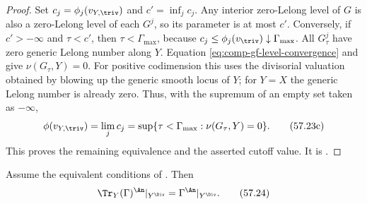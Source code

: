 \begin{proof}
Set $c_j=\phi_j(v_{Y,\triv})$ and $c'=\inf_jc_j$.
Any interior zero-Lelong level of $G$ is also a zero-Lelong level
of each $G^j$, so its parameter is at most $c'$.
Conversely, if $c'>-\infty$ and $\tau<c'$, then
$\tau<\Gamma_{\max}$, because
$c_j\leq\phi_j(v_{\triv})\downarrow\Gamma_{\max}$.
All $G^j_\tau$ have zero generic Lelong number along $Y$.
Equation \eqref{eq:comp-gf-level-convergence} and
\cite[Theorem~6.2.4]{XiaBook} give $\nu(G_\tau,Y)=0$.
For positive codimension this uses the divisorial valuation obtained
by blowing up the generic smooth locus of $Y$; for $Y=X$ the
generic Lelong number is already zero.
Thus, with the supremum of an empty set taken as $-\infty$,
\[
 \phi(v_{Y,\triv})=\lim_jc_j
 =\sup\{\tau<\Gamma_{\max}:\nu(G_\tau,Y)=0\}.
\tag{57.23c}\label{eq:comp-restriction-cutoff-value}
\]
This proves the remaining equivalence and the asserted cutoff value.
It is \cite[Lemma~4.19, Corollary~4.23]{XiaOperationsV3}.
\end{proof}

\begin{theorem}\label{thm:comp-trace}
Assume the equivalent conditions of
. Then
\[
 \Tr_Y(\Gamma)^{\An}|_{Y^{\Div}}
       =\Gamma^{\An}|_{Y^{\Div}}.
\tag{57.24}\label{eq:comp-trace}
\]
\end{theorem}

